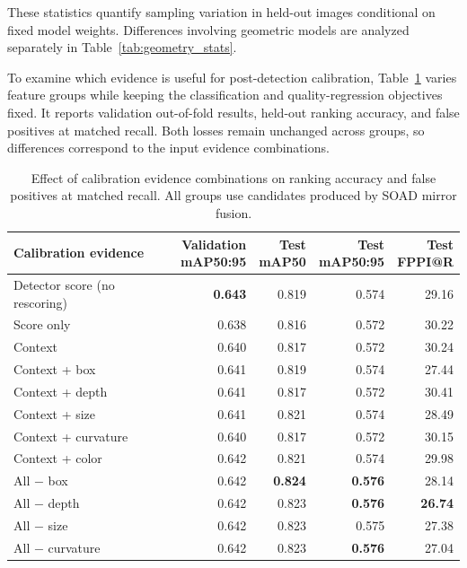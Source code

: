 \documentclass[11pt,a4paper]{article}
\begin{document}
These statistics quantify sampling variation in held-out images conditional on fixed model weights. Differences involving geometric models are analyzed separately in Table~\ref{tab:geometry_stats}.

To examine which evidence is useful for post-detection calibration, Table~\ref{tab:per} varies feature groups while keeping the classification and quality-regression objectives fixed. It reports validation out-of-fold results, held-out ranking accuracy, and false positives at matched recall. Both losses remain unchanged across groups, so differences correspond to the input evidence combinations.

\begin{table}[H]
\centering
\footnotesize
\caption{Effect of calibration evidence combinations on ranking accuracy and false positives at matched recall. All groups use candidates produced by SOAD mirror fusion.}
\label{tab:per}
\begin{adjustbox}{max width=\linewidth}
\begin{tabular}{lrrrr}
\toprule
Calibration evidence & \shortstack{Validation\\mAP50:95} & \shortstack{Test\\mAP50} & \shortstack{Test\\mAP50:95} & \shortstack{Test\\FPPI@R} \\
\midrule
Detector score (no rescoring) & \textbf{0.643} & 0.819 & 0.574 & 29.16 \\
\midrule
Score only & 0.638 & 0.816 & 0.572 & 30.22 \\
Context & 0.640 & 0.817 & 0.572 & 30.24 \\
Context + box & 0.641 & 0.819 & 0.574 & 27.44 \\
Context + depth & 0.641 & 0.817 & 0.572 & 30.41 \\
Context + size & 0.641 & 0.821 & 0.574 & 28.49 \\
Context + curvature & 0.640 & 0.817 & 0.572 & 30.15 \\
Context + color & 0.642 & 0.821 & 0.574 & 29.98 \\
All $-$ box & 0.642 & \textbf{0.824} & \textbf{0.576} & 28.14 \\
All $-$ depth & 0.642 & 0.823 & \textbf{0.576} & \textbf{26.74} \\
All $-$ size & 0.642 & 0.823 & 0.575 & 27.38 \\
All $-$ curvature & 0.642 & 0.823 & \textbf{0.576} & 27.04 \\

\end{tabular}
\end{adjustbox}
\end{table}
\end{document}
